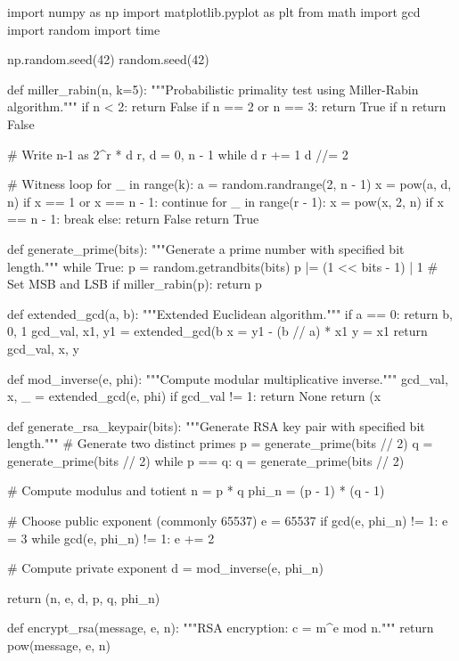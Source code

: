 \documentclass[a4paper, 11pt]{article}
\begin{document}
\begin{pycode}
import numpy as np
import matplotlib.pyplot as plt
from math import gcd
import random
import time

np.random.seed(42)
random.seed(42)

def miller_rabin(n, k=5):
    """Probabilistic primality test using Miller-Rabin algorithm."""
    if n < 2:
        return False
    if n == 2 or n == 3:
        return True
    if n %
        return False

    # Write n-1 as 2^r * d
    r, d = 0, n - 1
    while d %
        r += 1
        d //= 2

    # Witness loop
    for _ in range(k):
        a = random.randrange(2, n - 1)
        x = pow(a, d, n)
        if x == 1 or x == n - 1:
            continue
        for _ in range(r - 1):
            x = pow(x, 2, n)
            if x == n - 1:
                break
        else:
            return False
    return True

def generate_prime(bits):
    """Generate a prime number with specified bit length."""
    while True:
        p = random.getrandbits(bits)
        p |= (1 << bits - 1) | 1  # Set MSB and LSB
        if miller_rabin(p):
            return p

def extended_gcd(a, b):
    """Extended Euclidean algorithm."""
    if a == 0:
        return b, 0, 1
    gcd_val, x1, y1 = extended_gcd(b %
    x = y1 - (b // a) * x1
    y = x1
    return gcd_val, x, y

def mod_inverse(e, phi):
    """Compute modular multiplicative inverse."""
    gcd_val, x, _ = extended_gcd(e, phi)
    if gcd_val != 1:
        return None
    return (x %

def generate_rsa_keypair(bits):
    """Generate RSA key pair with specified bit length."""
    # Generate two distinct primes
    p = generate_prime(bits // 2)
    q = generate_prime(bits // 2)
    while p == q:
        q = generate_prime(bits // 2)

    # Compute modulus and totient
    n = p * q
    phi_n = (p - 1) * (q - 1)

    # Choose public exponent (commonly 65537)
    e = 65537
    if gcd(e, phi_n) != 1:
        e = 3
        while gcd(e, phi_n) != 1:
            e += 2

    # Compute private exponent
    d = mod_inverse(e, phi_n)

    return (n, e, d, p, q, phi_n)

def encrypt_rsa(message, e, n):
    """RSA encryption: c = m^e mod n."""
    return pow(message, e, n)


\end{pycode}
\end{document}
